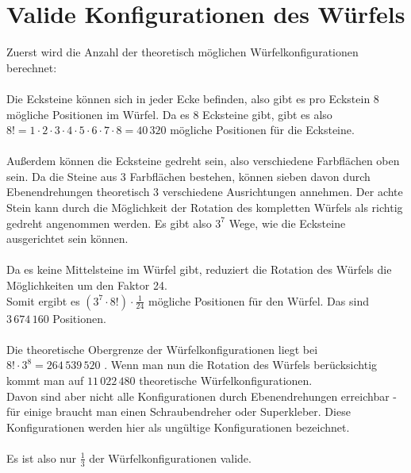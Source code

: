 \documentclass[12pt,a4paper, usenames, dvipsnames]{article}
\begin{document}














\newpage

\section{Valide Konfigurationen des Würfels}

Zuerst wird die Anzahl der theoretisch möglichen Würfelkonfigurationen berechnet: \\ 
\\
Die Ecksteine können sich in jeder Ecke befinden, also gibt es pro Eckstein 8 mögliche Positionen im Würfel. Da es 8 Ecksteine gibt, gibt es also $8! = 1 \cdot 2 \cdot 3 \cdot 4 \cdot 5 \cdot 6 \cdot 7 \cdot 8 = 40\, 320$ mögliche Positionen für die Ecksteine. \\ 
\\
Außerdem können die Ecksteine gedreht sein, also verschiedene Farbflächen oben sein. Da die Steine aus 3 Farbflächen bestehen, können sieben davon durch Ebenendrehungen theoretisch 3 verschiedene Ausrichtungen annehmen. Der achte Stein kann durch die Möglichkeit der Rotation des kompletten Würfels als richtig gedreht angenommen werden. Es gibt also $3^7$ Wege, wie die Ecksteine ausgerichtet sein können. \\
\\
Da es keine Mittelsteine im Würfel gibt, reduziert die Rotation des Würfels die Möglichkeiten um den Faktor 24. \\
Somit ergibt es $(3^7 \cdot 8!) \cdot \frac{1}{24}$ mögliche Positionen für den Würfel. Das sind $3\, 674\, 160$ Positionen.\\
\\
Die theoretische Obergrenze der Würfelkonfigurationen liegt bei $8! \cdot 3^8 = 264 \, 539 \, 520$ \cite{MMFAA}. Wenn man nun die Rotation des Würfels berücksichtig kommt man auf $11 \, 022 \, 480$ theoretische Würfelkonfigurationen. \\
Davon sind aber nicht alle Konfigurationen durch Ebenendrehungen erreichbar - für einige braucht man einen Schraubendreher oder Superkleber. Diese Konfigurationen werden hier als ungültige Konfigurationen bezeichnet. \\
\\
Es ist also nur $\frac{1}{3}$ der Würfelkonfigurationen valide.
 
\end{document}
